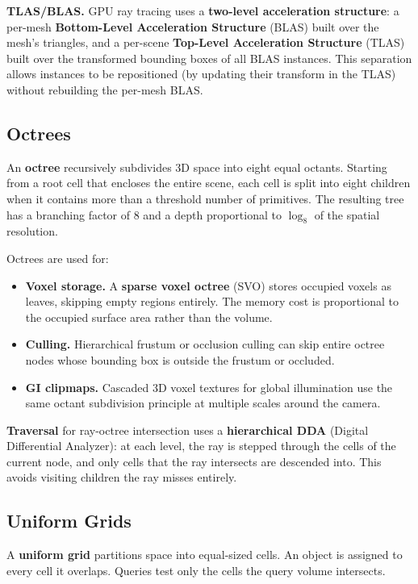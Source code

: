 \documentclass[
  11pt,
  letterpaper,
  DIV=11,
  numbers=noendperiod,
  twoside,
  open=right]{scrreprt}
\providecommand{\tightlist}{%
  \setlength{\itemsep}{0pt}\setlength{\parskip}{0pt}}
\begin{document}
\textbf{TLAS/BLAS.} GPU ray tracing uses a \textbf{two-level
acceleration structure}: a per-mesh \textbf{Bottom-Level Acceleration
Structure} (BLAS) built over the mesh's triangles, and a per-scene
\textbf{Top-Level Acceleration Structure} (TLAS) built over the
transformed bounding boxes of all BLAS instances. This separation allows
instances to be repositioned (by updating their transform in the TLAS)
without rebuilding the per-mesh BLAS.

\subsection{Octrees}\label{octrees}

An \textbf{octree} recursively subdivides 3D space into eight equal
octants. Starting from a root cell that encloses the entire scene, each
cell is split into eight children when it contains more than a threshold
number of primitives. The resulting tree has a branching factor of 8 and
a depth proportional to \(\log_8\) of the spatial resolution.

Octrees are used for:

\begin{itemize}
\tightlist
\item
  \textbf{Voxel storage.} A \textbf{sparse voxel octree} (SVO) stores
  occupied voxels as leaves, skipping empty regions entirely. The memory
  cost is proportional to the occupied surface area rather than the
  volume.
\item
  \textbf{Culling.} Hierarchical frustum or occlusion culling can skip
  entire octree nodes whose bounding box is outside the frustum or
  occluded.
\item
  \textbf{GI clipmaps.} Cascaded 3D voxel textures for global
  illumination use the same octant subdivision principle at multiple
  scales around the camera.
\end{itemize}

\textbf{Traversal} for ray-octree intersection uses a
\textbf{hierarchical DDA} (Digital Differential Analyzer): at each
level, the ray is stepped through the cells of the current node, and
only cells that the ray intersects are descended into. This avoids
visiting children the ray misses entirely.

\subsection{Uniform Grids}\label{uniform-grids}

A \textbf{uniform grid} partitions space into equal-sized cells. An
object is assigned to every cell it overlaps. Queries test only the
cells the query volume intersects.
\end{document}
